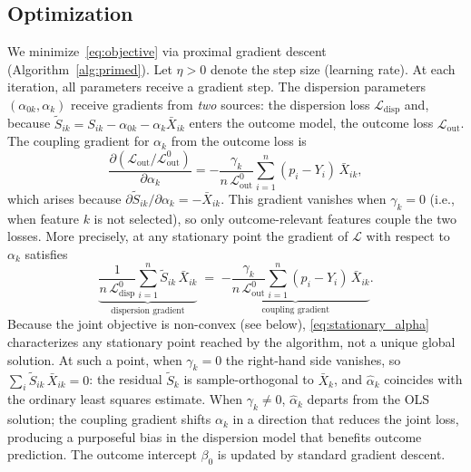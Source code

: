 \documentclass[referee,lineno,pdflatex,sn-vancouver-num]{sn-jnl}
\begin{document}
\subsection{Optimization}\label{sec:optimization}

We minimize~\eqref{eq:objective} via proximal gradient descent (Algorithm~\ref{alg:primed}).
Let $\eta > 0$ denote the step size (learning rate).
At each iteration, all parameters receive a gradient step.
The dispersion parameters $(\alpha_{0k}, \alpha_k)$ receive gradients from \emph{two} sources: the dispersion loss $\mathcal{L}_{\mathrm{disp}}$ and, because $\tilde S_{ik} = S_{ik} - \alpha_{0k} - \alpha_k \bar X_{ik}$ enters the outcome model, the outcome loss $\mathcal{L}_{\mathrm{out}}$.
The coupling gradient for $\alpha_k$ from the outcome loss is
\[
  \frac{\partial (\mathcal{L}_{\mathrm{out}}/\mathcal{L}_{\mathrm{out}}^0)}{\partial \alpha_k}
  = -\frac{\gamma_k}{n\,\mathcal{L}_{\mathrm{out}}^0} \sum_{i=1}^n (p_i - Y_i)\,\bar X_{ik},
\]
which arises because $\partial \tilde S_{ik}/\partial \alpha_k = -\bar X_{ik}$.
This gradient vanishes when $\gamma_k = 0$ (i.e., when feature $k$ is not selected), so only outcome-relevant features couple the two losses.
More precisely, at any stationary point the gradient of $\mathcal{L}$ with respect to $\alpha_k$ satisfies
\begin{equation}\label{eq:stationary_alpha}
  \underbrace{\frac{1}{n\,\mathcal{L}_{\mathrm{disp}}^0}\sum_{i=1}^n \tilde S_{ik}\,\bar X_{ik}}_{\text{dispersion gradient}}
  \;=\;
  \underbrace{-\frac{\gamma_k}{n\,\mathcal{L}_{\mathrm{out}}^0}\sum_{i=1}^n (p_i - Y_i)\,\bar X_{ik}}_{\text{coupling gradient}}.
\end{equation}
Because the joint objective is non-convex (see below), \eqref{eq:stationary_alpha} characterizes any stationary point reached by the algorithm, not a unique global solution.
At such a point, when $\gamma_k = 0$ the right-hand side vanishes, so $\sum_i \tilde S_{ik}\,\bar X_{ik} = 0$: the residual $\tilde S_k$ is sample-orthogonal to $\bar X_k$, and $\hat\alpha_k$ coincides with the ordinary least squares estimate.
When $\gamma_k \neq 0$, $\hat\alpha_k$ departs from the OLS solution; the coupling gradient shifts $\alpha_k$ in a direction that reduces the joint loss, producing a purposeful bias in the dispersion model that benefits outcome prediction.
The outcome intercept $\beta_0$ is updated by standard gradient descent.
\end{document}
